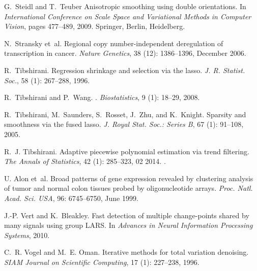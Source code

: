 \documentclass[twoside,11pt]{article}
\numberwithin{equation}{section}
\numberwithin{theorem}{section}
\begin{document}
\begin{thebibliography}{86}
G.~Steidl and T.~Teuber
\newblock Anisotropic smoothing using double orientations.
\newblock In \emph{International Conference on Scale Space and Variational Methods in Computer Vision}, pages 477--489, 2009. Springer, Berlin, Heidelberg.

N.~Stransky et~al.
\newblock Regional copy number-independent deregulation of transcription in
  cancer.
\newblock \emph{Nature Genetics}, 38 (12): 1386--1396,
  December 2006.

R.~Tibshirani.
\newblock Regression shrinkage and selection via the lasso.
\newblock \emph{J. R. Statist. Soc.}, 58 (1): 267--288, 1996.

R.~Tibshirani and P.~Wang.
.
\newblock \emph{Biostatistics}, 9 (1): 18--29, 2008.

R.~Tibshirani, M.~Saunders, S.~Rosset, J.~Zhu, and K.~Knight.
\newblock Sparsity and smoothness via the fused lasso.
\newblock \emph{J. Royal Stat. Soc.: Series B}, 67 (1):
  91--108, 2005.

R.~J. Tibshirani.
\newblock Adaptive piecewise polynomial estimation via trend filtering.
\newblock \emph{The Annals of Statistics}, 42 (1): 285--323,
  02 2014.
\newblock {}.

{U. Alon} et~al.
\newblock Broad patterns of gene expression revealed by clustering analysis of
  tumor and normal colon tissues probed by oligonucleotide arrays.
\newblock \emph{Proc. Natl. Acad. Sci. USA}, 96: 6745--6750, June
  1999.

J.-P. Vert and K.~Bleakley.
\newblock Fast detection of multiple change-points shared by many signals using
  group {LARS}.
\newblock In \emph{Advances in Neural Information Processing Systems}, 2010.

C.~R. Vogel and M.~E. Oman.
\newblock Iterative methods for total variation denoising.
\newblock \emph{SIAM Journal on Scientific Computing}, 17
  (1): 227--238, 1996.


\end{thebibliography}
\end{document}
